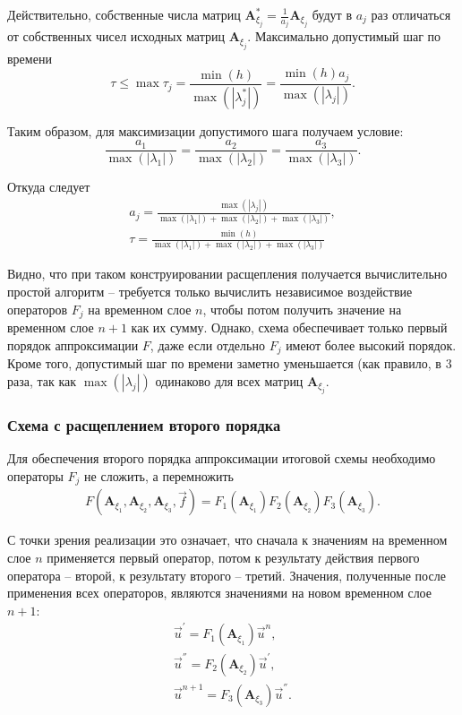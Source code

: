 Действительно, собственные числа матриц $\mathbf A_{\xi_j}^* = \frac{1}{a_j} \mathbf A_{\xi_j}$ будут в $a_j$ раз отличаться от собственных чисел исходных матриц $\mathbf A_{\xi_j}$. Максимально допустимый шаг по времени
\begin{equation}
\tau \le \max{\tau_j} = \frac{\min(h)}{\max(|\lambda_j^*|)} = \frac{\min(h)a_j}{\max(|\lambda_j|)}.
\end{equation}

Таким образом, для максимизации допустимого шага получаем условие:
\begin{equation}
\frac{a_1}{\max(|\lambda_1|)} = \frac{a_2}{\max(|\lambda_2|)} = \frac{a_3}{\max(|\lambda_3|)}.
\end{equation}

Откуда следует
\begin{eqnarray}
a_j = \frac{\max(|\lambda_j|)}{\max(|\lambda_1|)+\max(|\lambda_2|)+\max(|\lambda_3|)},\nonumber\\
\tau = \frac{\min(h)}{\max(|\lambda_1|)+\max(|\lambda_2|)+\max(|\lambda_3|)}
\end{eqnarray}

Видно, что при таком конструировании расщепления получается вычислительно простой алгоритм -- требуется только вычислить независимое воздействие операторов $F_j$ на временном слое $n$, чтобы потом получить значение на временном слое $n+1$ как их сумму. Однако, схема обеспечивает только первый порядок аппроксимации $F$, даже если отдельно $F_j$ имеют более высокий порядок. Кроме того, допустимый шаг по времени заметно уменьшается (как правило, в 3 раза, так как $\max(|\lambda_j|)$ одинаково для всех матриц $\mathbf A_{\xi_j}$.


\subsubsection{Схема с расщеплением второго порядка}

Для обеспечения второго порядка аппроксимации итоговой схемы необходимо операторы $F_j$ не сложить, а перемножить
\begin{eqnarray}
\label{split_scheme_2nd_order}
F(\mathbf A_{\xi_1}, \mathbf A_{\xi_2}, \mathbf A_{\xi_3}, \vec f) = F_1(\mathbf A_{\xi_1}) F_2(\mathbf A_{\xi_2}) F_3(\mathbf A_{\xi_3}).
\end{eqnarray}

С точки зрения реализации это означает, что сначала к значениям на временном слое $n$ применяется первый оператор, потом к результату действия первого оператора -- второй, к результату второго -- третий. Значения, полученные после применения всех операторов, являются значениями на новом временном слое $n+1$:
\begin{eqnarray}
\vec u^{'} = F_1(\mathbf A_{\xi_1}) \vec u^n, \nonumber\\
\vec u^{''} = F_2(\mathbf A_{\xi_2}) \vec u^{'}, \nonumber\\
\vec u^{n+1} = F_3(\mathbf A_{\xi_3}) \vec u^{''}.
\end{eqnarray}

